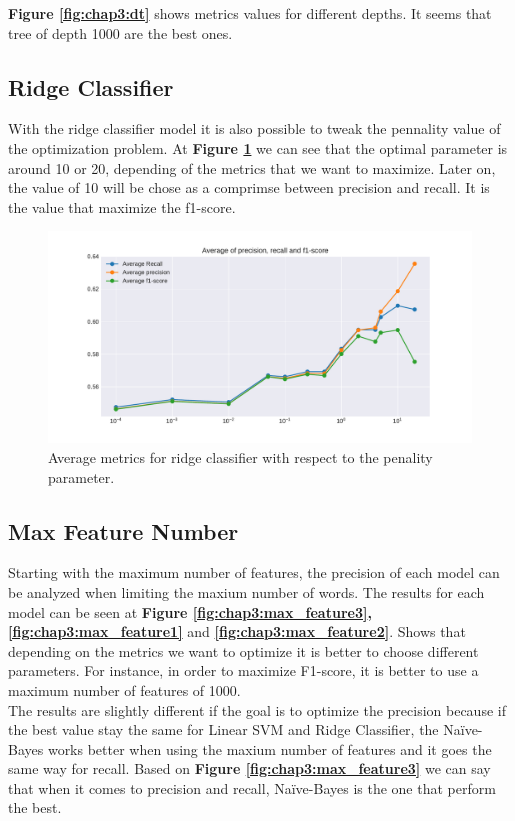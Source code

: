 \textbf{Figure \ref{fig:chap3:dt}} shows metrics values for different depths. It seems that tree of depth 1000 are the best ones.
\subsection{Ridge Classifier}
With the ridge classifier model it is also possible to tweak the pennality value of the optimization problem. At \textbf{Figure \ref{fig:chap3:ridge1}} we can see that the optimal parameter is around 10 or 20, depending of the metrics that we want to maximize. Later on, the value of 10 will be chose as a comprimse between precision and recall. It is the value that maximize the f1-score. 

\begin{figure}
	\centering
	\includegraphics[width=1\textwidth]{images/chapitre3/liar-ridge}
	\caption{Average metrics for ridge classifier with respect to the penality parameter.}
	\label{fig:chap3:ridge1}
\end{figure} 
\subsection{Max Feature Number}

Starting with the maximum number of features, the precision of each model can be analyzed when limiting the maxium number of words. The results for each model can be seen at \textbf{Figure \ref{fig:chap3:max_feature3}, \ref{fig:chap3:max_feature1}} and \textbf{\ref{fig:chap3:max_feature2}}. Shows that depending on the metrics we want to optimize it is better to choose different parameters. For instance, in order to maximize F1-score, it is better to use a maximum number of features of 1000.\\

The results are slightly different if the goal is to optimize the precision because if the best value stay the same for Linear SVM and Ridge Classifier, the Naïve-Bayes works better when using the maxium number of features and it goes the same way for recall. 
Based on \textbf{Figure \ref{fig:chap3:max_feature3}} we can say that when it comes to precision and recall, Naïve-Bayes is the one that perform the best.\\

